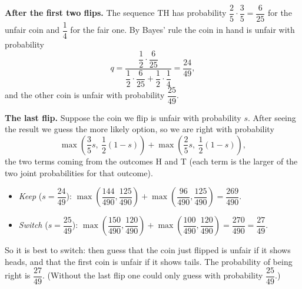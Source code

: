 \textbf{After the first two flips.} The sequence TH has probability $\dfrac25\cdot\dfrac35=\dfrac6{25}$ for the unfair coin and $\dfrac14$ for the fair one. By Bayes' rule the coin in hand is unfair with probability
\[q=\dfrac{\dfrac12\cdot\dfrac6{25}}{\dfrac12\cdot\dfrac6{25}+\dfrac12\cdot\dfrac14}=\dfrac{24}{49},\]
and the other coin is unfair with probability $\dfrac{25}{49}$.

\textbf{The last flip.} Suppose the coin we flip is unfair with probability $s$. After seeing the result we guess the more likely option, so we are right with probability
\[\max\left(\dfrac35s,\ \dfrac12(1-s)\right)+\max\left(\dfrac25s,\ \dfrac12(1-s)\right),\]
the two terms coming from the outcomes H and T (each term is the larger of the two joint probabilities for that outcome).
\begin{itemize}
\item \emph{Keep} ($s=\dfrac{24}{49}$): $\max\left(\dfrac{144}{490},\dfrac{125}{490}\right)+\max\left(\dfrac{96}{490},\dfrac{125}{490}\right)=\dfrac{269}{490}$.
\item \emph{Switch} ($s=\dfrac{25}{49}$): $\max\left(\dfrac{150}{490},\dfrac{120}{490}\right)+\max\left(\dfrac{100}{490},\dfrac{120}{490}\right)=\dfrac{270}{490}=\dfrac{27}{49}$.
\end{itemize}
So it is best to switch: then guess that the coin just flipped is unfair if it shows heads, and that the first coin is unfair if it shows tails. The probability of being right is $\boxed{\dfrac{27}{49}}$. (Without the last flip one could only guess with probability $\dfrac{25}{49}$.)

